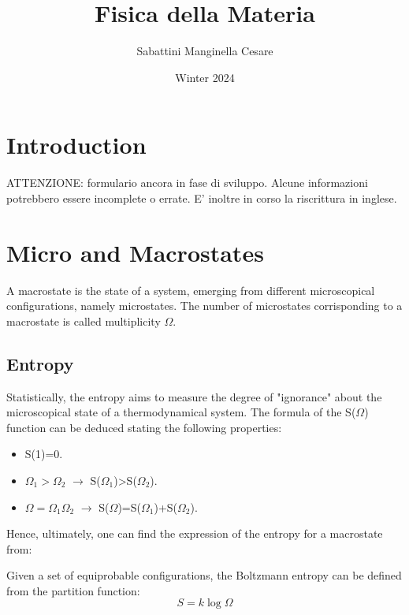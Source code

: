 \documentclass{article}
\title{Fisica della Materia}
\author{Sabattini Manginella Cesare}
\date{Winter 2024}
\begin{document}
\maketitle

\tableofcontents

\newpage

\section{Introduction}
ATTENZIONE: formulario ancora in fase di sviluppo. Alcune informazioni potrebbero essere incomplete o errate.
E' inoltre in corso la riscrittura in inglese.

\newpage

\section{Micro and Macrostates}
A macrostate is the state of a system, emerging from different microscopical configurations, namely microstates.
The number of microstates corrisponding to a macrostate is called multiplicity $\Omega$.

\subsection{Entropy}
Statistically, the entropy aims to measure the degree of "ignorance" about the microscopical state of a thermodynamical system.
The formula of the S($\Omega$) function can be deduced stating the following properties:

\begin{itemize}
    \item S(1)=0.
    \item $\Omega_1>\Omega_2$ $\rightarrow$ S($\Omega_1$)>S($\Omega_2$).
    \item $\Omega=\Omega_1\Omega_2$ $\rightarrow$ S($\Omega$)=S($\Omega_1$)+S($\Omega_2$).
\end{itemize}

Hence, ultimately, one can find the expression of the entropy for a macrostate from:

\begin{tcolorbox}[colframe=gray!50, colback=gray!10, coltitle=black, title=Boltzmann Entropy]
    Given a set of equiprobable configurations, the Boltzmann entropy can be defined from the partition function:
    \begin{equation}
        S = k \log \Omega
    \end{equation}
\end{tcolorbox}
\end{document}
